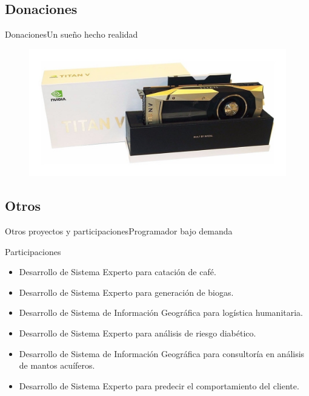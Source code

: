 \documentclass{beamer}
\begin{document}
    \subsection{Donaciones}
    \begin{frame}{Donaciones}{Un sueño hecho realidad}
        \begin{figure}[]
            \centering
            \includegraphics[width=\textwidth]{titan}
        \end{figure}
    \end{frame}

    \subsection{Otros}
    \begin{frame}{Otros proyectos y participaciones}{Programador bajo demanda}
        \begin{exampleblock}{Participaciones}{
            \begin{itemize}
                \item Desarrollo de Sistema Experto para catación de café.
                \item Desarrollo de Sistema Experto para generación de biogas.
                \item Desarrollo de Sistema de Información Geográfica para logística humanitaria.
                \item Desarrollo de Sistema Experto para análisis de riesgo diabético.
                \item Desarrollo de Sistema de Información Geográfica para
                consultoría en análisis de mantos acuíferos.
                \item Desarrollo de Sistema Experto para predecir el comportamiento del cliente.
            \end{itemize}
        }
        \end{exampleblock}
    \end{frame}
\end{document}
